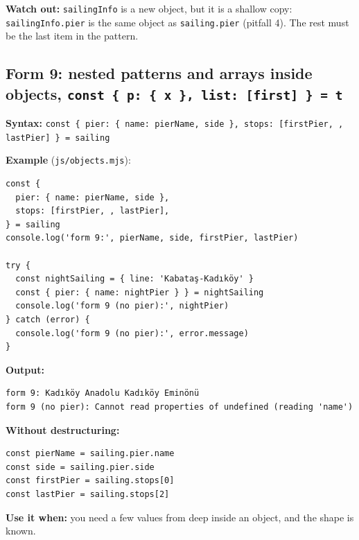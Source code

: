 \documentclass[
  10pt,
]{article}
\begin{document}
\textbf{Watch out:} \texttt{sailingInfo} is a new object, but it is a
shallow copy: \texttt{sailingInfo.\allowbreak{}pier} is the same object
as \texttt{sailing.\allowbreak{}pier} (pitfall 4). The rest must be the
last item in the pattern.

\hypertarget{form-9-nested-patterns-and-arrays-inside-objects-const--p--x--list-first---t}{%
\subsection{\texorpdfstring{Form 9: nested patterns and arrays inside
objects,
\texttt{const \{ p:\allowbreak{} \{ x \},\allowbreak{} list:\allowbreak{} [\allowbreak{}first] \} =\allowbreak{} t}}{Form 9: nested patterns and arrays inside objects, }}\label{form-9-nested-patterns-and-arrays-inside-objects-const--p--x--list-first---t}}

\textbf{Syntax:}
\texttt{const \{ pier:\allowbreak{} \{ name:\allowbreak{} pierName,\allowbreak{} side \},\allowbreak{} stops:\allowbreak{} [\allowbreak{}firstPier,\allowbreak{} ,\allowbreak{} lastPier] \} =\allowbreak{} sailing}

\textbf{Example} (\texttt{js/\allowbreak{}objects.\allowbreak{}mjs}):

\begin{verbatim}
const {
  pier: { name: pierName, side },
  stops: [firstPier, , lastPier],
} = sailing
console.log('form 9:', pierName, side, firstPier, lastPier)

try {
  const nightSailing = { line: 'Kabataş-Kadıköy' }
  const { pier: { name: nightPier } } = nightSailing
  console.log('form 9 (no pier):', nightPier)
} catch (error) {
  console.log('form 9 (no pier):', error.message)
}
\end{verbatim}

\textbf{Output:}

\begin{verbatim}
form 9: Kadıköy Anadolu Kadıköy Eminönü
form 9 (no pier): Cannot read properties of undefined (reading 'name')
\end{verbatim}

\textbf{Without destructuring:}

\begin{verbatim}
const pierName = sailing.pier.name
const side = sailing.pier.side
const firstPier = sailing.stops[0]
const lastPier = sailing.stops[2]
\end{verbatim}

\textbf{Use it when:} you need a few values from deep inside an object,
and the shape is known.
\end{document}
